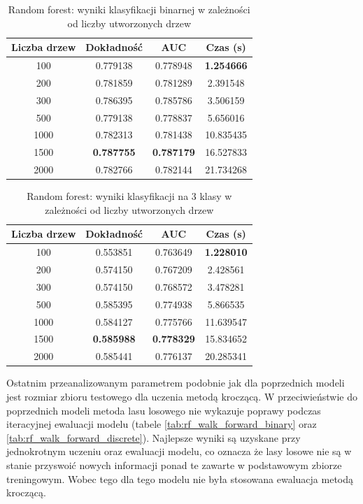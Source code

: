 \documentclass[a4paper, twoside, 11pt, openright]{article}
\begin{document}
\begin{table}[H]
    \centering
    \begin{tabular}{|c|c|c|c|}
    \hline
        \textbf{Liczba drzew} & \textbf{Dokładność} & \textbf{AUC} & \textbf{Czas (s)} \\ \hline
100        &  0.779138 &  0.778948 &    \textbf{1.254666} \\ \hline
200        &  0.781859 &  0.781289 &    2.391548 \\ \hline
300        &  0.786395 &  0.785786 &    3.506159 \\ \hline
500       &  0.779138 &  0.778837 &    5.656016 \\ \hline
1000       &  0.782313 &  0.781438 &   10.835435 \\ \hline
1500      &  \textbf{0.787755} &  \textbf{0.787179} &   16.527833 \\ \hline
2000       &  0.782766 &  0.782144 &   21.734268 \\ \hline
    \end{tabular}
    \caption{Random forest: wyniki klasyfikacji binarnej w zależności od liczby utworzonych drzew}
    \label{tab:rf_estimators_binary}
\end{table}

\begin{table}[H]
    \centering
    \begin{tabular}{|c|c|c|c|}
    \hline
        \textbf{Liczba drzew} & \textbf{Dokładność} & \textbf{AUC} & \textbf{Czas (s)} \\ \hline
100        &  0.553851 &  0.763649 &    \textbf{1.228010} \\ \hline
200        &  0.574150 &  0.767209 &    2.428561 \\ \hline
300        &  0.574150 &  0.768572 &    3.478281 \\ \hline
500        &  0.585395 &  0.774938 &    5.866535 \\ \hline
1000       &  0.584127 &  0.775766 &   11.639547 \\ \hline
1500       &  \textbf{0.585988} &  \textbf{0.778329} &   15.834652 \\ \hline
2000      &  0.585441 &  0.776137 &   20.285341 \\ \hline
    \end{tabular}
    \caption{Random forest: wyniki klasyfikacji na 3 klasy w zależności od liczby utworzonych drzew}
    \label{tab:rf_estimators_discrete}
\end{table}

Ostatnim przeanalizowanym parametrem podobnie jak dla poprzednich modeli jest rozmiar zbioru testowego dla uczenia metodą kroczącą. W przeciwieństwie do poprzednich modeli metoda lasu losowego nie wykazuje poprawy podczas iteracyjnej ewaluacji modelu (tabele \ref{tab:rf_walk_forward_binary} oraz \ref{tab:rf_walk_forward_discrete}). Najlepsze wyniki są uzyskane przy jednokrotnym uczeniu oraz ewaluacji modelu, co oznacza że lasy losowe nie są w stanie przyswoić nowych informacji ponad te zawarte w podstawowym zbiorze treningowym. Wobec tego dla tego modelu nie była stosowana ewaluacja metodą kroczącą.
\end{document}
